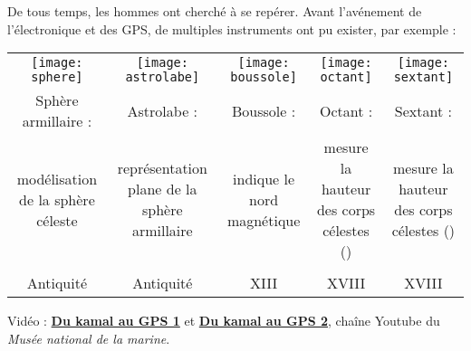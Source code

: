 \begin{debat} 
   De tous temps, les hommes ont cherché à se repérer. Avant l'avénement de l'électronique et des GPS, de multiples instruments ont pu exister, par exemple : 
   \begin{center}
   \textcolor{B1}{\small
      \begin{tabular}{*{5}{C{3}}}
         \texttt{[image: sphere]} & \texttt{[image: astrolabe]} & \texttt{[image: boussole]}  & \texttt{[image: octant]} & \texttt{[image: sextant]} \\
        Sphère armillaire : & Astrolabe : & Boussole : & Octant : & Sextant : \\
        modélisation de la sphère céleste & représentation plane de la sphère armillaire & indique le nord magnétique & mesure la hauteur des corps célestes () & mesure la hauteur des corps célestes () \\
        & & & & \\
        Antiquité & Antiquité & {\small XIII} & {\small XVIII} & {\small XVIII} \\
     \end{tabular}}
   \end{center}
   \bigskip
   \begin{cadre}[B2][J4]
      \begin{center}
         Vidéo : \href{https://www.yout-ube.com/watch?v=E0KvuFx0Mr8}{\bf Du kamal au GPS 1} et \href{https://www.youtube.com/watch?v=Jv21tvyZokk}{\bf Du kamal au GPS 2}, chaîne Youtube du {\it Musée national de la marine}. 
      \end{center}
   \end{cadre}
\end{debat}


\activites


